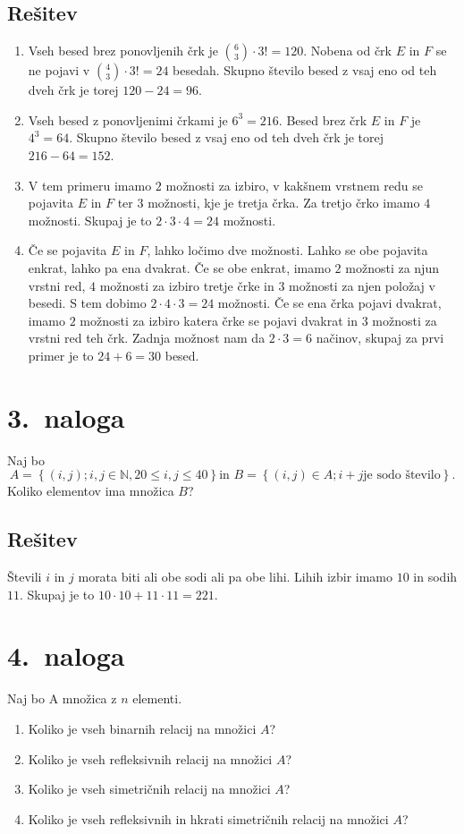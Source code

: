 \documentclass[11pt]{article}
\begin{document}
\subsection*{Rešitev}
\begin{enumerate}[label = (\alph*)]
    \item Vseh besed brez ponovljenih črk je \(\binom{6}{3} \cdot 3! = 120\). Nobena od črk \(E\) in \(F\) se ne pojavi v \(\binom{4}{3} \cdot 3! = 24\) besedah. 
        Skupno število besed z vsaj eno od teh dveh črk je torej \(120 - 24 = 96\).
    \item Vseh besed z ponovljenimi črkami je \(6^3 = 216\). Besed brez črk \(E\) in \(F\) je \(4^3 = 64\).
        Skupno število besed z vsaj eno od teh dveh črk je torej \(216 - 64 = 152\).
    \item V tem primeru imamo \(2\) možnosti za izbiro, v kakšnem vrstnem redu se pojavita \(E\) in \(F\) ter \(3\) možnosti, kje je tretja črka. Za tretjo črko imamo \(4\)
        možnosti. Skupaj je to \(2 \cdot 3 \cdot 4 = 24\) možnosti.
    \item Če se pojavita \(E\) in \(F\), lahko ločimo dve možnosti.
        Lahko se obe pojavita enkrat, lahko pa ena dvakrat. Če se obe enkrat, imamo \(2\) možnosti za njun vrstni red, \(4\) možnosti za izbiro tretje črke in \(3\) možnosti za 
        njen položaj v besedi. S tem dobimo \(2 \cdot 4 \cdot 3 = 24\) možnosti. Če se ena črka pojavi dvakrat, imamo \(2\) možnosti za izbiro katera črke se pojavi dvakrat
        in \(3\) možnosti za vrstni red teh črk. Zadnja možnost nam da \(2 \cdot 3 = 6\) načinov, skupaj za prvi primer je to \(24 + 6 = 30\) besed.
\end{enumerate}

\section*{3.~naloga}
    Naj bo
    \[A = \left\{\left(i, j\right); i, j \in \mathbb{N}, 20 \le i, j \le 40\right\} \text{in \ } B = \left\{(i, j) \in A; i + j \text{je sodo število}\right\}.\]
    Koliko elementov ima množica \(B\)?
\subsection*{Rešitev}
    Števili \(i\) in \(j\) morata biti ali obe sodi ali pa obe lihi. Lihih izbir imamo \(10\) in sodih \(11\). Skupaj je to \(10 \cdot 10 + 11 \cdot 11 = 221\).

\section*{4.~naloga}
Naj bo A množica z \(n\) elementi. \begin{enumerate}[label = (\alph*)]
    \item Koliko je vseh binarnih relacij na množici \(A\)?
    \item Koliko je vseh refleksivnih relacij na množici \(A\)?
    \item Koliko je vseh simetričnih relacij na množici \(A\)?
    \item Koliko je vseh refleksivnih in hkrati simetričnih relacij na množici \(A\)?
\end{enumerate}
\end{document}

